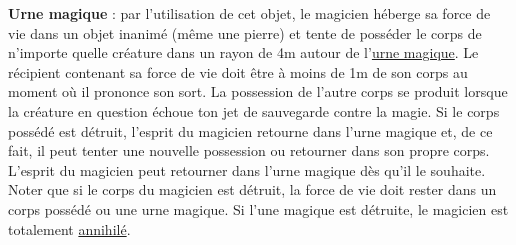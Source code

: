 \bigskip

\label{sort-urne-magique}\textbf{Urne magique} : par l'utilisation de cet objet, le magicien héberge sa force de vie dans un objet inanimé (même une pierre) et tente de posséder le corps de n'importe quelle créature dans un rayon de 4m autour de l'\uline{urne magique}. Le récipient contenant sa force de vie doit être à moins de 1m de son corps au moment où il prononce son sort. La possession de l'autre corps se produit lorsque la créature en question échoue ton jet de sauvegarde contre la magie. Si le corps possédé est détruit, l'esprit du magicien retourne dans l'urne magique et, de ce fait, il peut tenter une nouvelle possession ou retourner dans son propre corps. L'esprit du magicien peut retourner dans l'urne magique dès qu'il le souhaite. Noter que si le corps du magicien est détruit, la force de vie doit rester dans un corps possédé ou une urne magique. Si l'une magique est détruite, le magicien est totalement \uline{annihilé}.

